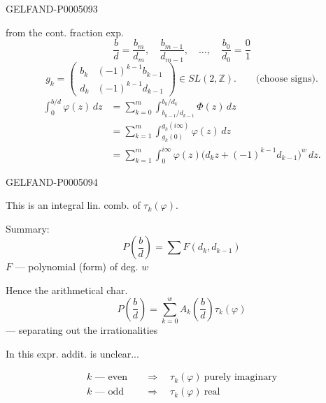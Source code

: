 \begin{GelfandAdjacentEvidence}{GELFAND-P000509}{3}


from the cont. fraction exp.
\[
\frac bd=\frac{b_m}{d_m},\quad\frac{b_{m-1}}{d_{m-1}},\quad
\ldots,\quad\frac{b_0}{d_0}=\frac01
\]
\[
g_k=\begin{pmatrix}
b_k&(-1)^{k-1}b_{k-1}\\
d_k&(-1)^{k-1}d_{k-1}
\end{pmatrix}\in SL(2,\mathbb Z).
\qquad\text{(choose signs).}
\]
\[
\begin{aligned}
\int_0^{b/d}\varphi(z)\,dz
&=\sum_{k=0}^m\int_{b_{k-1}/d_{k-1}}^{b_k/d_k}\Phi(z)\,dz\\
&=\sum_{k=1}^m\int_{g_k(0)}^{g_k(i\infty)}\varphi(z)\,dz\\
&=\sum_{k=1}^m\int_0^{i\infty}\varphi(z)
  \bigl(d_kz+(-1)^{k-1}d_{k-1}\bigr)^w\,dz.
\end{aligned}
\]
\end{GelfandAdjacentEvidence}
\begin{GelfandAdjacentEvidence}{GELFAND-P000509}{4}

This is an integral lin. comb. of $\tau_k(\varphi)$.

Summary:
\[
P\left(\frac bd\right)=\sum F(d_k,d_{k-1})
\]
$F$ — polynomial (form) of deg. $w$

Hence the arithmetical char.
\[
P\left(\frac bd\right)=\sum_{k=0}^w A_k\left(\frac bd\right)\tau_k(\varphi)
\]
\hfill — separating out the irrationalities\par

In this expr. addit. is unclear...
\end{GelfandAdjacentEvidence}


\[
\begin{aligned}
k\text{ — even}&\quad\Rightarrow\quad\tau_k(\varphi)\ \text{purely imaginary}\\
k\text{ — odd}&\quad\Rightarrow\quad\tau_k(\varphi)\ \text{real}
\end{aligned}
\]


